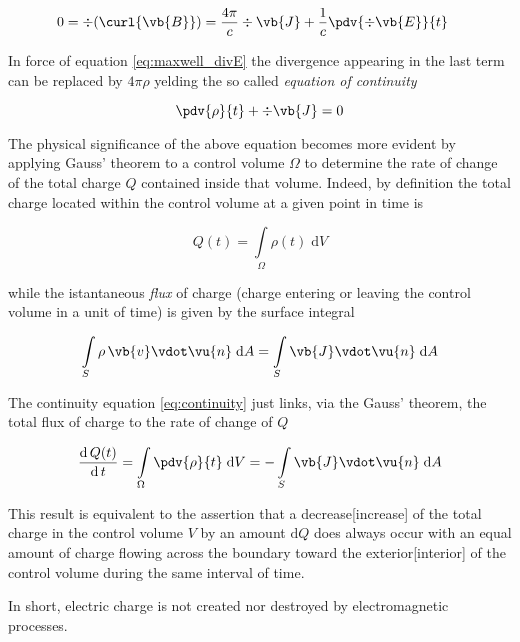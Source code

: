 \begin{align*}
0 &= \div{(\curl{\vb{B}})} = \frac{4 \pi}{c} \div{\vb{J}} + \frac{1}{c} \pdv{\div{\vb{E}}}{t}
\end{align*}

In force of equation \ref{eq:maxwell_divE} the divergence appearing in the last term can be replaced by $4\pi\rho$ yelding the so called \textit{equation of continuity}  

\begin{equation}
\pdv{\rho}{t} + \div{\vb{J}}= 0 \label{eq:continuity}
\end{equation}

The physical significance of the above equation becomes more evident by applying Gauss' theorem to a control volume $\Omega$ to determine the rate of change of the total charge $Q$ contained inside that volume. Indeed, by definition the total charge located within the control volume at a given point in time is

\begin{equation*}
Q(t) = \int\limits_{\Omega}\rho(t) \; \mathrm{d}V 
\end{equation*}

while the istantaneous \textit{flux} of charge (charge entering or leaving the control volume in a unit of time) is given by the surface integral

\begin{equation*}
\int\limits_{S}\rho \,\vb{v} \vdot \vu{n} \; \mathrm{d}A = \int\limits_{S} \vb{J} \vdot \vu{n} \; \mathrm{d}A 
\end{equation*}

The continuity equation \ref{eq:continuity} just links, via the Gauss' theorem, the total flux of charge to the rate of change of $Q$  

\begin{equation*}
\frac{\mathrm{d} \, Q(t)}{\mathrm{d} \, t}  = \int\limits_{\Omega} \pdv{\rho}{t} \; \mathrm{d}V = - \int\limits_{S}\vb{J} \vdot \vu{n} \; \mathrm{d}A 
\end{equation*}

This result is equivalent to the assertion that a decrease[increase] of the total charge in the control volume $V$ by an amount $\mathrm{d}Q$ does always occur with an equal amount of charge flowing across the boundary toward the exterior[interior] of the control volume during the same interval of time. 

In short, electric charge is not created nor destroyed by electromagnetic processes. 

